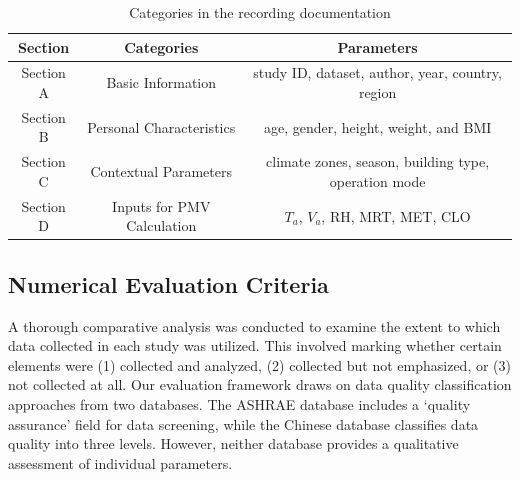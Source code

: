 \documentclass[final,3p,times,12pt]{elsarticle}
\begin{document}
\begin{table}[h!]
\centering
\renewcommand{\arraystretch}{1.1} %
\setlength{\tabcolsep}{5pt} %
\begin{tabular}{ccc}
\hline
\textbf{Section} & \textbf{Categories} & \textbf{Parameters} \\ \hline
Section A & Basic Information & study ID, dataset, author, year, country, region \\
Section B & Personal Characteristics & age, gender, height, weight, and BMI \\
Section C & Contextual Parameters & climate zones, season, building type, operation mode \\
Section D & Inputs for PMV Calculation & $T_a$, $V_a$, RH, MRT, MET, CLO \\ \hline
\end{tabular}
\caption{Categories in the recording documentation}
\label{table 1}
\end{table}

\subsection{Numerical Evaluation Criteria}
\label{subsec1}

A thorough comparative analysis was conducted to examine the extent to which data collected in each study was utilized. This involved marking whether certain elements were (1) collected and analyzed, (2) collected but not emphasized, or (3) not collected at all. Our evaluation framework draws on data quality classification approaches from two databases. The ASHRAE database \cite{foldvarylicinaDevelopmentASHRAEGlobal2018a} includes a ‘quality assurance’ field for data screening, while the Chinese database \cite{yangChineseThermalComfort2023} classifies data quality into three levels. However, neither database provides a qualitative assessment of individual parameters.
\end{document}
